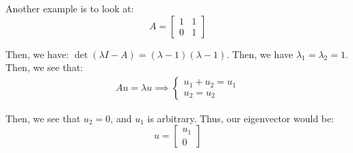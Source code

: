 \documentclass[openany]{book}
\begin{document}
\begin{example}
	Another example is to look at:
	\begin{equation*}
		A = \begin{bmatrix}
			 1 & 1 \\ 0 & 1
		\end{bmatrix}
	\end{equation*}

	Then, we have: $\det (\lambda I - A) = (\lambda - 1)(\lambda - 1)$. Then, we have $\lambda_1 = \lambda_2 = 1$. Then, we see that:
	\begin{align*}
		Au = \lambda u \implies \begin{cases}
			u_1 + u_2 = u_1 \\
			u_2 = u_2
		\end{cases}
	\end{align*}

	Then, we see that $u_2 = 0$, and $u_1$ is arbitrary. Thus, our eigenvector would be:
	\begin{equation*}
		u = \begin{bmatrix}
			u_1 \\ 0
		\end{bmatrix}
	\end{equation*}
\end{example}
\end{document}
